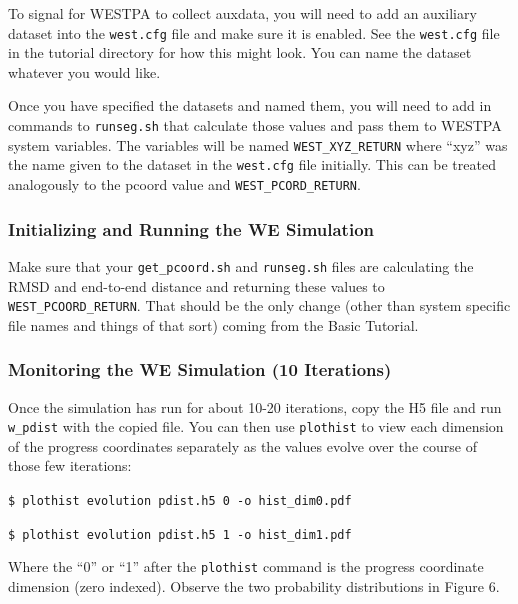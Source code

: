 \documentclass[9pt,tutorial]{livecoms}
\begin{document}
To signal for WESTPA to collect auxdata, you will need to add an auxiliary dataset into the \verb|west.cfg| file and make sure it is enabled. 
See the \verb|west.cfg| file in the tutorial directory for how this might look. 
You can name the dataset whatever you would like. 

Once you have specified the datasets and named them, you will need to add in commands to \verb|runseg.sh| that calculate those values and pass them to WESTPA system variables. 
The variables will be named \verb|WEST_XYZ_RETURN| where “xyz” was the name given to the dataset in the \verb|west.cfg| file initially. 
This can be treated analogously to the pcoord value and \verb|WEST_PCORD_RETURN|.

\subsubsection{Initializing and Running the WE Simulation}

Make sure that your \verb|get_pcoord.sh| and \verb|runseg.sh| files are calculating the RMSD and end-to-end distance and returning these values to \verb|WEST_PCOORD_RETURN|. 
That should be the only change (other than system specific file names and things of that sort) coming from the Basic Tutorial.

\subsubsection{Monitoring the WE Simulation (10 Iterations)}

Once the simulation has run for about 10-20 iterations, copy the H5 file and run \verb|w_pdist| with the copied file. 
You can then use \verb|plothist| to view each dimension of the progress coordinates separately as the values evolve over the course of those few iterations:

\verb|$ plothist evolution pdist.h5 0 -o hist_dim0.pdf|

\verb|$ plothist evolution pdist.h5 1 -o hist_dim1.pdf|

Where the “0” or “1” after the \verb|plothist| command is the progress coordinate dimension (zero indexed). 
Observe the two probability distributions in Figure 6.
\end{document}
